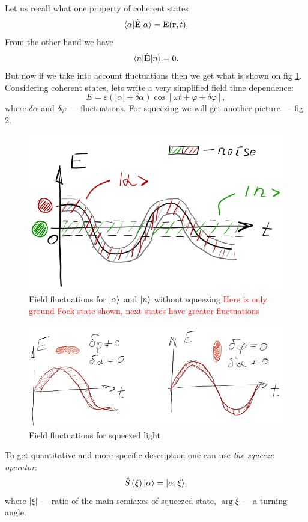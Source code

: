 Let us recall what one property of coherent states
\begin{equation}
	\langle\alpha\rvert \hat{\mathbf{E}} \lvert\alpha\rangle = \mathbf{E} (\mathbf{r},t).
\end{equation}
From the other hand we have
\begin{equation}
	\langle n\rvert \hat{\mathbf{E}} \lvert n\rangle = 0.
\end{equation}
But now if we take into account fluctuations then we get what is shown on fig \ref{fig:noise_MC}. Considering coherent states, lets write a very simplified field time dependence:
\begin{equation}
	E = \varepsilon \left( |\alpha| + \delta \alpha\right) \cos \left[ \omega t + \varphi + \delta \varphi \right],
\end{equation}
where $\delta \alpha$ and $\delta \varphi$ --- fluctuations. For squeezing we will get another picture --- fig \ref{fig:eeeEEeee}.
\begin{figure}
	\centering
	\includegraphics[width=0.65\linewidth]{fig/L2/noise_MC}
	\caption{Field fluctuations for $\lvert\alpha\rangle$ and $\lvert n\rangle$ without squeezing {\textcolor{red}{Here is only ground Fock state shown, next states have greater fluctuations}}}
	\label{fig:noise_MC}
\end{figure}

\begin{figure}
	\centering
	\includegraphics[width=0.7\linewidth]{fig/L2/eeeEEeee}
	\caption{Field fluctuations for squeezed light}
	\label{fig:eeeEEeee}
\end{figure}

To get quantitative and more specific description one can use \textit{the squeeze operator}:
\begin{equation}
	\hat{S} \left( \xi \right) \lvert\alpha\rangle = \lvert\alpha, \xi\rangle,
\end{equation}
where $|\xi|$ --- ratio of the main semiaxes of squeezed state, $\arg  \xi $ --- a turning angle.


